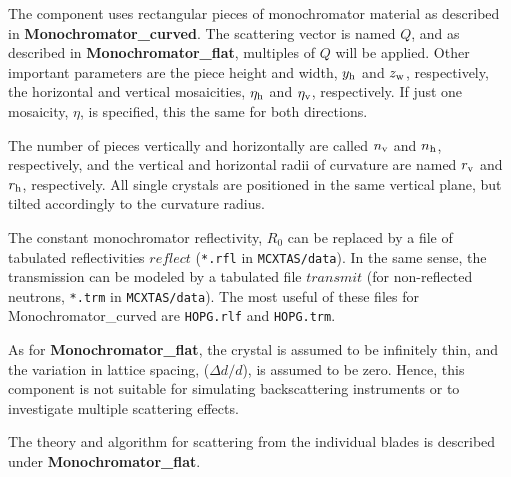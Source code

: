 The component uses rectangular pieces of monochromator material
as described in {\bf Monochromator\_curved}.
The scattering vector is named $Q$, and as described in
{\bf Monochromator\_flat}, multiples of $Q$ will be applied.
Other important parameters are the piece height and width,
$y_{\rm h}$ and $z_{\rm w}$, respectively, the
horizontal and vertical mosaicities, $\eta_{\rm h}$ and $\eta_{\rm v}$,
respectively.
If just one mosaicity, $\eta$, is specified, this the same for both directions.

The number of pieces vertically and horizontally are called
$n_{\rm v}$ and $n_{\rm h}$, respectively, and the vertical and horizontal
radii of curvature are named $r_{\rm v}$ and $r_{\rm h}$, respectively.
All single crystals are positioned in the same vertical plane,
but tilted accordingly to the curvature radius.

The constant monochromator reflectivity, $R_0$ can be replaced by
a file of tabulated reflectivities $reflect$ (\verb+*.rfl+ in \verb+MCXTAS/data+). In the same sense, the transmission
can be modeled by a tabulated file $transmit$ (for non-reflected neutrons, \verb+*.trm+ in \verb+MCXTAS/data+).
The most useful of these files for Monochromator\_curved are \verb+HOPG.rlf+ and \verb+HOPG.trm+.

As for {\bf Monochromator\_flat}, the crystal is assumed to be infinitely
thin, and the variation in lattice spacing, ($\Delta d/d$),
is assumed to be zero. Hence, this
component is not suitable for simulating backscattering instruments or to
investigate multiple scattering effects.

The theory and algorithm for scattering from
the individual blades is described under {\bf Monochromator\_flat}.
